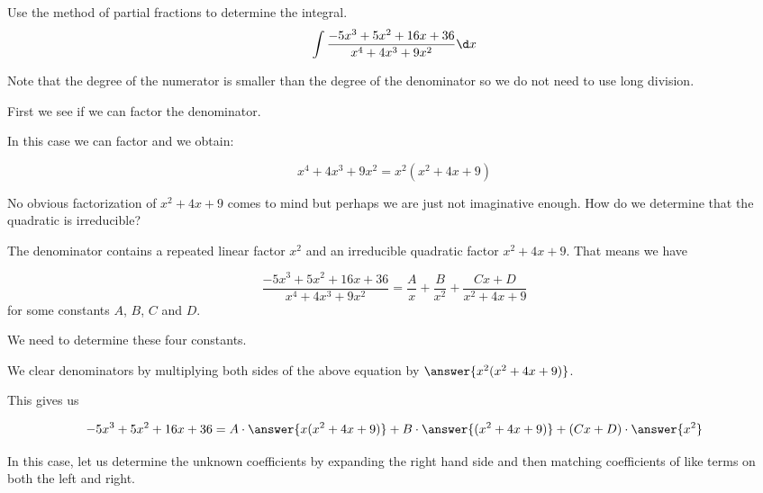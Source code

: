 \documentclass{ximera}
\author{Jim Talamo and Jason Miller}
\begin{document}
\begin{exercise}
Use the method of partial fractions to determine the integral.
\[
\int \frac{-5x^3+5x^2+16x+36}{x^{4}+4x^3+9x^2} \d x
\]

Note that the degree of the numerator is smaller than the degree of the denominator so we do not need 
to use long division. 

First we see if we can factor the denominator. 

In this case we can factor and we obtain:

\[
x^{4}+4x^3+9x^2=x^2(x^2+4x+9)
\]

No obvious factorization of $x^2+4x+9$ comes to mind but perhaps we are just not imaginative enough.  How do we determine that the quadratic is irreducible?

\begin{multipleChoice}
\end{multipleChoice}


  \begin{multipleChoice}
  \end{multipleChoice}

\begin{exercise} 

The denominator contains a repeated linear factor $x^2$ and an irreducible quadratic factor $x^2+4x+9$. 
That means we have

\[
 \frac{-5x^3+5x^2+16x+36}{x^{4}+4x^3+9x^2}= \frac{A}{x} + \frac{B}{x^2} +\frac{Cx+D}{x^2+4x+9}
\]
for some constants $A$, $B$, $C$ and $D$.

We need to determine these four constants. 

We clear denominators by multiplying both sides of the above equation by $\answer{x^2(x^2+4x+9)}$. 

This gives us 

\[
-5x^3+5x^2+16x+36=A \cdot \answer{ x(x^2+4x+9)} + B \cdot \answer{ (x^2+4x+9)} +  (Cx+D) \cdot \answer{x^2}
\]

In this case, let us determine the unknown coefficients by expanding the right hand side and then matching coefficients of like terms on both the left and right. 


\end{exercise}
\end{exercise}
\end{document}
